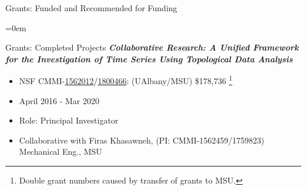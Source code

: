 \documentclass{resume} %
\begin{document}
\begin{rSection}{Grants: Funded and Recommended for Funding}
\begin{itemize}{}{\leftmargin=0em}
\end{itemize}



\end{rSection}
\begin{rSection}{Grants: Completed Projects}
\textbf{\textit{Collaborative Research: A Unified Framework for the Investigation of Time Series Using Topological Data Analysis}}
\vspace{-.1in}
\begin{itemize}{}{\leftmargin=0em}
   \itemsep -0.6em %
   \item
NSF CMMI-\href{https://nsf.gov/awardsearch/showAward?AWD_ID=1562012}{1562012}/\href{https://nsf.gov/awardsearch/showAward?AWD_ID=1800466}{1800466}: (UAlbany/MSU)  \$178,736 \footnote{Double grant numbers caused by transfer of grants to MSU.}
\item
April 2016 - Mar 2020
   \item
Role: Principal Investigator
\item Collaborative with
  Firas Khasawneh, (PI: CMMI-1562459/1759823) Mechanical Eng., MSU

\end{itemize}



\end{rSection}
\end{document}
